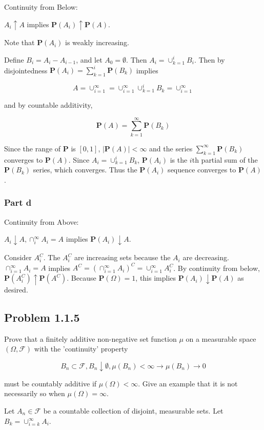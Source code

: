 \documentclass{article}
\newcommand{\F}{\mathcal{F}}
\newcommand{\prob}{\boldsymbol{P}}
\begin{document}
Continuity from Below:

$A_i \uparrow A$ implies $\prob(A_i) \uparrow \prob(A)$.

Note that $\prob(A_i)$ is weakly increasing.

Define $B_i = A_i - A_{i-1}$, and let $A_0 = \emptyset$. Then $A_i = \cup_{k=1}^i B_i$. Then by disjointedness $\prob(A_i) = \sum_{k=1}^i \prob(B_k)$ implies

\[
A = \cup_{i=1}^\infty = \cup_{i=1}^\infty \cup_{k=1}^i B_k = \cup_{i=1}^\infty
\]

and by countable additivity,

\[
\prob(A) = \sum_{k=1}^\infty \prob(B_k)
\]

Since the range of $\prob$ is $[0, 1]$, $|\prob(A)| < \infty$ and the series $\sum_{k=1}^\infty \prob(B_k)$ converges to $\prob(A)$. Since $A_i = \cup_{k=1}^i B_k$, $\prob(A_i)$ is the $i$th partial sum of the $\prob(B_k)$ series, which converges. Thus the $\prob(A_i)$ sequence converges to $\prob(A)$.

\subsubsection*{Part d}

Continuity from Above:

$A_i \downarrow A, \cap_i^\infty A_i = A$ implies $\prob(A_i) \downarrow A$.

Consider $A_i^C$. The $A_i^C$ are increasing sets because the $A_i$ are decreasing. $\cap_{i=1}^\infty A_i = A$ implies $A^C = (\cap_{i=1}^\infty A_i)^C = \cup_{i=1}^\infty A_i^C$. By continuity from below, $\prob(A_i^C) \uparrow \prob(A^C)$. Because $\prob(\Omega) = 1$, this implies $\prob(A_i) \downarrow \prob(A)$ as desired. 

\subsection*{Problem 1.1.5}

Prove that a finitely additive non-negative set function $\mu$ on a measurable space $(\Omega, \F)$ with the 'continuity' property

\[
B_n \subset \F, B_n \downarrow \emptyset, \mu(B_n) < \infty \longrightarrow \mu(B_n) \rightarrow 0
\]

must be countably additive if $\mu(\Omega) < \infty$. Give an example that it is not necessarily so when $\mu(\Omega) = \infty$.

Let $A_n \in \F$ be a countable collection of disjoint, measurable sets. Let $B_k = \cup_{i=k}^\infty A_i$.
\end{document}
